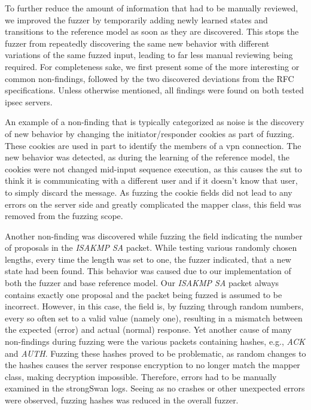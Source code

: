To further reduce the amount of information that had to be manually reviewed, we improved the fuzzer by temporarily adding newly learned states and transitions to the reference model as soon as they are discovered. This stops the fuzzer from repeatedly discovering the same new behavior with different variations of the same fuzzed input, leading to far less manual reviewing being required. For completeness sake, we first present some of the more interesting or common non-findings, followed by the two discovered deviations from the RFC specifications. Unless otherwise mentioned, all findings were found on both tested \ac{ipsec} servers.

An example of a non-finding that is typically categorized as noise is the discovery of new behavior by changing the initiator/responder cookies as part of fuzzing. These cookies are used in part to identify the members of a \ac{vpn} connection. The new behavior was detected, as during the learning of the reference model, the cookies were not changed mid-input sequence execution, as this causes the \ac{sut} to think it is communicating with a different user and if it doesn't know that user, to simply discard the message. As fuzzing the cookie fields did not lead to any errors on the server side and greatly complicated the mapper class, this field was removed from the fuzzing scope. 

Another non-finding was discovered while fuzzing the field indicating the number of proposals in the \emph{ISAKMP SA} packet. While testing various randomly chosen lengths, every time the length was set to one, the fuzzer indicated, that a new state had been found. This behavior was caused due to our implementation of both the fuzzer and base reference model. Our \emph{ISAKMP SA} packet always contains exactly one proposal and the packet being fuzzed is assumed to be incorrect. However, in this case, the field is, by fuzzing through random numbers, every so often set to a valid value (namely one), resulting in a mismatch between the expected (error) and actual (normal) response. 
Yet another cause of many non-findings during fuzzing were the various packets containing hashes, e.g., \emph{ACK} and \emph{AUTH}. Fuzzing these hashes proved to be problematic, as random changes to the hashes causes the server response encryption to no longer match the mapper class, making decryption impossible. Therefore, errors had to be manually examined in the strongSwan logs. Seeing as no crashes or other unexpected errors were observed, fuzzing hashes was reduced in the overall fuzzer. 

